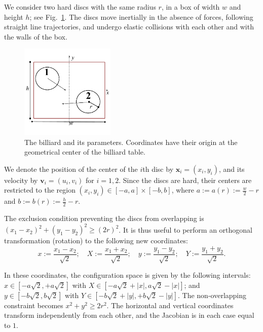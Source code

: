 \documentclass[superscriptaddress,pre,reprint,showpacs,onecolumn]{revtex4-1}
\newcommand{\defeq}{:=}
\begin{document}
We consider two hard discs with the same radius $r$,
in a box of width $w$ and height $h$; see Fig.~\ref{billar01}. 
The discs move inertially in the absence of forces, 
following straight line trajectories,
and undergo elastic collisions with each 
other and with the walls of the box.

\begin{figure}[h]
  \begin{center}
  \includegraphics[width=0.40\textwidth]{FigurasPerfectas/DiscosenCajaCuadrada01.pdf}
  \end{center}
  \caption{The billiard and its parameters. Coordinates
    have their origin at the geometrical center of the 
    billiard table.}\label{billar01}
\end{figure}


We denote the position of the center of the $i$th disc by 
$\mathbf{x}_i = (x_i, y_i)$, and its velocity by $\mathbf{v}_i = (u_i, v_i)$ for $i=1,2$. Since the discs are hard, 
their centers are restricted to the region 
$(x_i, y_i) \in [-a,a] \times [-b, b]$, where 
$a \defeq a(r) \defeq \frac{w}{2} - r $ and
$b \defeq b(r) \defeq \frac{h}{2} - r $.

The exclusion condition preventing the discs from overlapping is $(x_1-x_2)^2 + (y_1-y_2)^2 \ge (2r)^2$.
It is thus useful to perform an orthogonal transformation (rotation) to the following new coordinates:
\begin{equation}\label{cambiocoor01}
 x \defeq \frac{x_1 - x_2}{\sqrt{2}}; 
\quad X \defeq \frac{x_1 + x_2}{\sqrt{2}}; 
\quad y \defeq \frac{y_1 - y_2}{\sqrt{2}}; 
\quad Y \defeq \frac{y_1 + y_2}{\sqrt{2}}.
\end{equation}

In these coordinates, the configuration space is given by the following
intervals:
$x \in [-a \sqrt{2}, +a \sqrt{2}]$ with 
$X \in [-a \sqrt{2} + |x|, a \sqrt{2} - |x|]$; and 
 $y \in [-b \sqrt{2}, b \sqrt{2}]$ with $Y \in [-b \sqrt{2} + |y|, +b \sqrt{2} - |y|]$.
The non-overlapping constraint becomes $x^2 + y^2 \ge 2 r^2$.
The horizontal and vertical coordinates transform independently
from each other, and the Jacobian is in each case equal to $1$.
\end{document}
